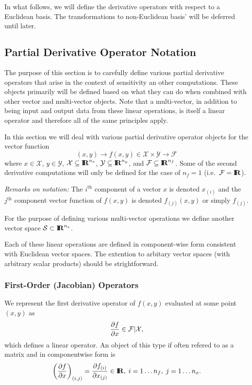 \documentclass[pdf,ps2pdf,11pt]{SANDreport}
\begin{document}
In what follows, we will define the derivative operators with respect to a
Euclidean basis.  The transformations to non-Euclidean basis' will be deferred
until later.

\subsection{Partial Derivative Operator Notation}

The purpose of this section is to carefully define various partial derivative
operators that arise in the context of sensitivity an other computations.
These objects primarily will be defined based on what they can do when
combined with other vector and multi-vector objects.  Note that a
multi-vector, in addition to being input and output data from these linear
operations, is itself a linear operator and therefore all of the same
principles apply.

In this section we will deal with various partial derivative operator objects
for the vector function
%
\begin{equation}
(x,y) \rightarrow f(x,y) \in \mathcal{X} \times \mathcal{Y} \rightarrow \mathcal{F}
\end{equation}
%
where $x\in\mathcal{X}$, $y\in\mathcal{Y}$, $\mathcal{X}\subseteq\mbox{\textbf{I}}\hspace{-0.6ex}\mbox{\textbf{R}}^{n_x}$,
$\mathcal{Y}\subseteq\mbox{\textbf{I}}\hspace{-0.6ex}\mbox{\textbf{R}}^{n_y}$, and $\mathcal{F}\subseteq\mbox{\textbf{I}}\hspace{-0.6ex}\mbox{\textbf{R}}^{n_f}$.  Some of
the second derivative computations will only be defined for the case of
$n_f=1$ (i.e.\ $\mathcal{F}=\mbox{\textbf{I}}\hspace{-0.6ex}\mbox{\textbf{R}}$).

{}\textit{Remarks on notation:} The $i^{\mbox{th}}$ component of a vector $x$
is denoted $x_{(i)}$ and the $j^{\mbox{th}}$ component vector function of
$f(x,y)$ is denoted $f_{(j)}(x,y)$ or simply $f_{(j)}$.

For the purpose of defining various multi-vector operations we define another
vector space $\mathcal{S}\subset\mbox{\textbf{I}}\hspace{-0.6ex}\mbox{\textbf{R}}^{n_s}$.

Each of these linear operations are defined in component-wise form consistent
with Euclidean vector spaces.  The extention to arbitary vector spaces (with
arbitrary scalar products) should be strightforward.

\subsubsection{First-Order (Jacobian) Operators}

We represent the first derivative operator of $f(x,y)$ evaluated at some point
$(x,y)$ as
%
\begin{equation}
\displaystyle{\frac{\partial f}{\partial x}}\in\mathcal{F}|\mathcal{X},
\end{equation}
%
which defines a linear operator.  An object of this type if often refered to
as a matrix and in componentwise form is
%
\begin{equation}
\left(\displaystyle{\frac{\partial f}{\partial x}}\right)_{(i,j)} = \displaystyle{\frac{\partial f_{(i)}}{\partial x_{(j)}}} \in\mbox{\textbf{I}}\hspace{-0.6ex}\mbox{\textbf{R}}, \; i = 1 \ldots n_f, \; j = 1 \ldots n_x.
\end{equation}
\end{document}
